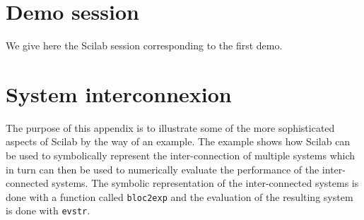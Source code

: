 
\appendix
\chapter{Demo session}
We give here the Scilab session corresponding to the first demo.



\chapter{System interconnexion}

	The purpose of this appendix is to illustrate some
of the more sophisticated aspects of Scilab by the way of an example.
The example shows how Scilab can be used to symbolically represent
the inter-connection of multiple systems which in turn can 
then be used to numerically evaluate the performance of the
inter-connected systems.  The symbolic representation of the
inter-connected systems is done with a function called {\tt bloc2exp}
and the evaluation of the resulting system is done with
{\tt evstr}.

